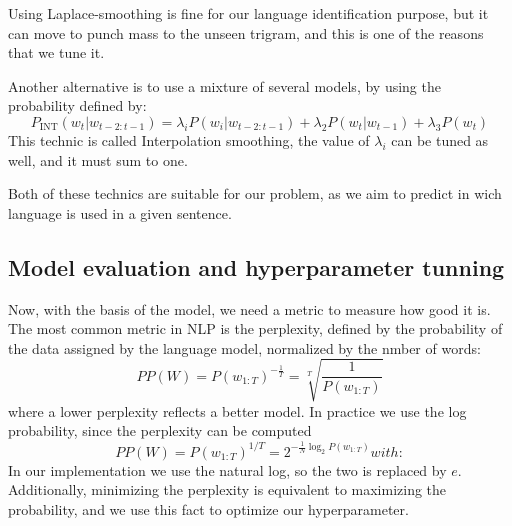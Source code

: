 Using Laplace-smoothing is fine for our language identification purpose, but it can move to punch mass to the unseen trigram, and this is one of the reasons that we tune it.

Another alternative is to use a mixture of several models, by using the probability defined by:
\begin{equation}
    P_{\mathrm{INT}}(w_t|w_{t-2:t-1}) =\lambda_iP(w_i|w_{t-2:t-1}) + \lambda_2P(w_t|w_{t-1}) + \lambda_3P(w_t) 
\end{equation}
This technic is called Interpolation smoothing, the value of $\lambda_i$ can be tuned as well, and it must sum to one.

Both of these technics are suitable for our problem, as we aim to predict in wich language is used in a given sentence.

\subsection{Model evaluation and hyperparameter tunning}
Now, with the basis of the model, we need a metric to measure how good it is. The most common metric in NLP is the perplexity, defined by the probability of the data assigned by the language model, normalized by the nmber of words:
\begin{equation}
    PP(W) = P(w_{1:T})^{-\frac{1}{T}} = \sqrt[T]{\frac{1}{P(w_{1:T})}}
\end{equation}
where a lower perplexity reflects a better model.
In practice we use the log probability, since the perplexity can be computed \begin{equation}
    PP(W) = P(w_{1:T})^{1/T} = 2^{-\frac{1}{N}\log_2 P(w_{1:T})}
with:\end{equation}
In our implementation we use the natural log, so the two is replaced by $e$.
Additionally, minimizing the perplexity is equivalent to maximizing the probability, and we use this fact to optimize our hyperparameter.
